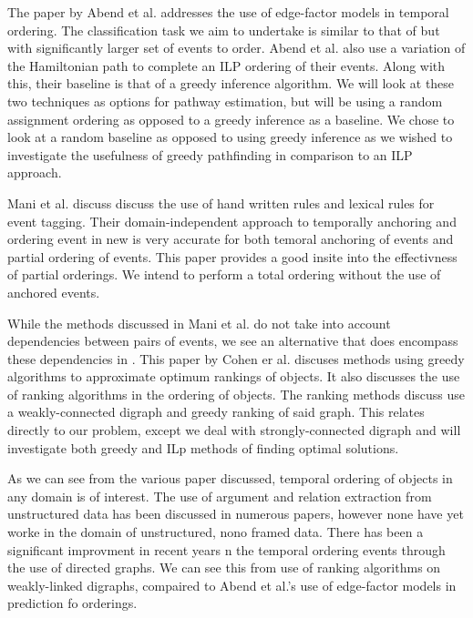 \documentclass[bsc,frontabs,twoside,singlespacing,parskip,deptreport]{infthesis}     %
\begin{document}
The paper by  Abend et al. \cite{abend2015lexical} addresses the use of
edge-factor models in temporal ordering. The classification task we aim to undertake is similar to that of \cite{abend2015lexical}
but with significantly larger set of events to order.
Abend et al.\cite{abend2015lexical} also use a variation of the Hamiltonian path
to complete an ILP ordering of their events. Along with this, their baseline is that of a greedy inference algorithm.
We will look at these two techniques as options for pathway estimation, but will be using a random assignment ordering as
opposed to a greedy inference as a baseline. We chose to look at a random baseline as opposed to using greedy inference as
we wished to investigate the usefulness of greedy pathfinding in comparison to an ILP approach.

Mani et al.\cite{mani2006machine} discuss discuss the use of hand written rules and lexical rules for event tagging.
Their domain-independent approach to temporally anchoring and ordering event in new is very accurate for both temoral
anchoring of events and partial ordering of events. This paper provides a good insite into the effectivness of
partial orderings. We intend to perform a total ordering without the use of anchored events.

While the methods discussed in Mani et al. \cite{mani2006machine} do not take into account dependencies between pairs of events, 
we see an alternative that does encompass
these dependencies in \cite{schapire1998learning}.
This paper by Cohen er al. discuses methods using greedy algorithms to approximate optimum rankings of objects.
It also discusses the use of ranking algorithms in the ordering of objects. The ranking methods discuss use a
weakly-connected digraph and greedy ranking of said graph. This relates directly to our problem,
except we deal with strongly-connected digraph and will investigate both greedy and ILp methods of finding
optimal solutions.


As we can see from the various paper discussed, temporal ordering of objects in any domain is of interest.
The use of argument and relation extraction from unstructured data has been discussed in numerous papers,
however none have yet worke in the domain of unstructured, nono framed data.
There has been a significant improvment in recent years n the temporal ordering events through the use of
directed graphs. We can see this from \cite{schapire1998learning} use of ranking algorithms on weakly-linked
digraphs, compaired to Abend et al.'s \cite{abend2015lexical} use of edge-factor models in prediction fo orderings. 
\end{document}
